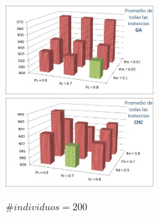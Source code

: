 \documentclass[journal]{IEEEtran}
\begin{document}
\begin{figure}[]
  \centering
    \includegraphics[width=0.5\textwidth]{./figuras/Graficas/Comparacion/GA-200IND.jpg}
    \includegraphics[width=0.5\textwidth]{./figuras/Graficas/Comparacion/CHC-200IND.jpg}
  \caption{$\#individuos=200$}
  \label{fig:comp200}
\end{figure} 



\newpage
\end{document}
